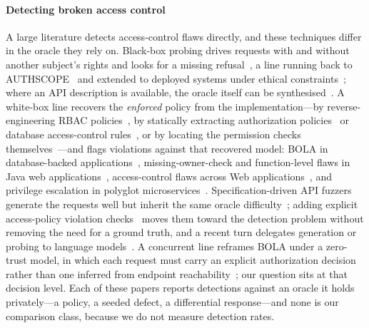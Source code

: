 \paragraph{Detecting broken access control} A large literature detects access-control
flaws directly, and these techniques differ in the oracle they rely on. Black-box probing
drives requests with and without another subject's rights and looks for a missing
refusal~\cite{Liu2025BACScan,Dharmaadi2025BACFuzz}, a line running back to
AUTHSCOPE~\cite{Zuo2017AUTHSCOPE} and extended to deployed systems under ethical
constraints~\cite{Chehade2025Forbidden}; where an API description is available, the oracle
itself can be synthesised~\cite{Filho2025Automated}. A white-box line recovers the
\emph{enforced} policy from the implementation---by reverse-engineering RBAC
policies~\cite{Le2021Automated}, by statically extracting authorization
policies~\cite{Berger2020Static} or database access-control
rules~\cite{Zhang2026Extracting}, or by locating the permission checks
themselves~\cite{Shi2025Facilitating}---and flags violations against that recovered model:
BOLA in database-backed applications~\cite{Huang2024Detecting}, missing-owner-check and
function-level flaws in Java web applications~\cite{Liu2025MOCGuard,Feng2025JAuthGuard},
access-control flaws across Web applications~\cite{Schlaubitz2025A}, and privilege
escalation in polyglot microservices~\cite{Li2026Detecting}. Specification-driven API
fuzzers generate the requests well but inherit the same oracle
difficulty~\cite{Atlidakis2019RESTler,Arcuri2024Advanced,Seran2025Handling}; adding
explicit access-policy violation checks~\cite{Sahin2027Enhancing} moves them toward the
detection problem without removing the need for a ground truth, and a recent turn
delegates generation or probing to language
models~\cite{Uddin2026Automated,Sun2025LLM,Wang2025Large}. A concurrent line reframes BOLA
under a zero-trust model, in which each request must carry an explicit authorization
decision rather than one inferred from endpoint reachability~\cite{Wu2026Rethinking}; our
question sits at that decision level. Each of these papers reports detections against an
oracle it holds privately---a policy, a seeded defect, a differential response---and none
is our comparison class, because we do not measure detection rates.

